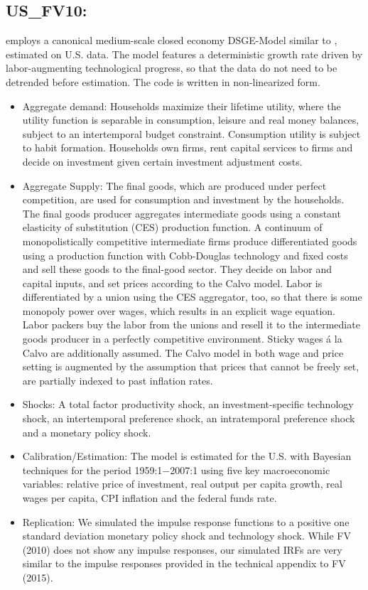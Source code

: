 \documentclass[11pt,a4paper]{article}
\begin{document}
	
	\subsection{US\_FV10: \cite{fernandez2010econometrics}}
	\label{USFV10}
	\cite{fernandez2010econometrics} employs a canonical medium-scale closed economy DSGE-Model similar to \cite{SmetsWouters2007}, estimated on U.S. data. The model features a deterministic growth rate driven by labor-augmenting technological progress, so that the data do not need to be detrended before estimation. The code is written in non-linearized form.
	\begin{itemize}
		\item Aggregate demand: Households maximize their lifetime utility, where the utility function is separable in consumption, leisure and real money balances, subject to an intertemporal budget constraint. Consumption utility is subject to habit formation. Households own firms, rent capital services to firms and decide on investment given certain investment adjustment costs. 
		\item Aggregate Supply: The final goods, which are produced under perfect competition, are used for consumption and investment by the households. The final goods producer aggregates intermediate goods using a constant elasticity of substitution (CES) production function. A continuum of monopolistically competitive intermediate firms produce differentiated goods using a production function with Cobb-Douglas technology and fixed costs and sell these goods to the final-good sector. They decide on labor and capital inputs, and set prices according to the Calvo model. Labor is differentiated by a union using the CES aggregator, too, so that there is some monopoly power over wages, which results in an explicit wage equation. Labor packers buy the labor from the unions and resell it to the intermediate goods producer in a perfectly competitive environment. Sticky wages \'a la Calvo are additionally assumed. The Calvo model in both wage and price setting is augmented by the assumption that prices that cannot be freely set, are partially indexed to past inflation rates.
		\item Shocks: A total factor productivity shock, an investment-specific technology shock, an intertemporal preference shock, an intratemporal preference shock and a monetary policy shock.
		\item Calibration/Estimation: The model is estimated for the U.S. with Bayesian techniques for the period 1959:1$-$2007:1 using five key macroeconomic variables: relative price of investment, real output per capita growth, real wages per capita, CPI inflation and the federal funds rate. 
		\item Replication: We simulated the impulse response functions to a positive one standard deviation monetary policy shock and technology shock. While FV (2010) does not show any impulse responses, our simulated IRFs are very similar to the impulse responses provided in the technical appendix to FV (2015). 
	\end{itemize} 
	
\end{document}
